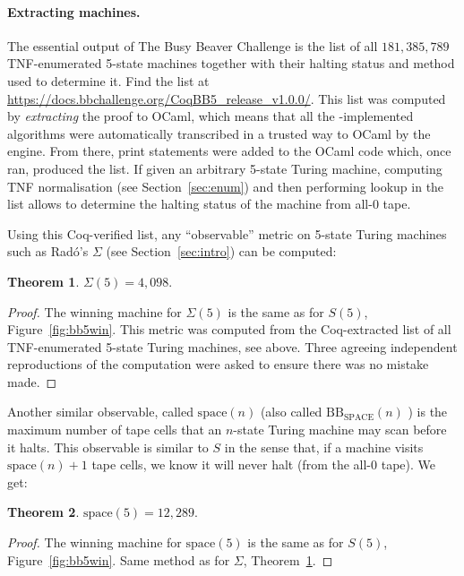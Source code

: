 \documentclass[a4paper,british]{article}
\theoremstyle{definition} %
\newtheorem{theorem}{Theorem}[section]
\numberwithin{equation}{section}
\theoremstyle{definition} %
\newcommand{\BBtheFifthTNF}{181{,}385{,}789}
\newcommand{\rado}{Rad\'o\xspace}
\begin{document}
\paragraph{Extracting machines.} The essential output of The Busy Beaver Challenge is the list of all $\BBtheFifthTNF$ TNF-enumerated 5-state machines together with their halting status and method used to determine it. Find the list at \url{https://docs.bbchallenge.org/CoqBB5_release_v1.0.0/}. This list was computed by \textit{extracting} the \Coq proof to OCaml, which means that all the \Coq-implemented algorithms were automatically transcribed  in a trusted way to OCaml by the \Coq engine. From there, print statements were added to the OCaml code which, once ran, produced the list. If given an arbitrary 5-state Turing machine, computing TNF normalisation (see Section~\ref{sec:enum}) and then performing lookup in the list allows to determine the halting status of the machine from all-0 tape.

Using this Coq-verified list, any ``observable'' metric on 5-state Turing machines such as \rado's $\Sigma$ (see Section~\ref{sec:intro}) can be computed:

\begin{theorem}\label{th:Sigma5}
    $\Sigma(5) = 4{,}098$.
\end{theorem}
\begin{proof}
    The winning machine for $\Sigma(5)$ is the same as for $S(5)$, Figure~\ref{fig:bb5win}.
    This metric was computed from the Coq-extracted list of all TNF-enumerated 5-state Turing machines, see above. Three agreeing independent reproductions of the computation were asked to ensure there was no mistake made.
\end{proof}

Another similar observable, called $\text{space}(n)$ \cite{Ben-Amram1996} (also called $\text{BB}_{\text{SPACE}}(n)$ \cite{sterin_2022_14955828}) is the maximum number of tape cells that an $n$-state Turing machine may scan before it halts. This observable is similar to $S$ in the sense that, if a machine visits $\text{space}(n)+1$ tape cells, we know it will never halt (from the all-0 tape). We get:

\begin{theorem}
    $\text{space}(5) = 12{,}289$.
\end{theorem}
\begin{proof}
    The winning machine for $\text{space}(5)$ is the same as for $S(5)$, Figure~\ref{fig:bb5win}.
    Same method as for $\Sigma$, Theorem~\ref{th:Sigma5}.
\end{proof}
\end{document}
